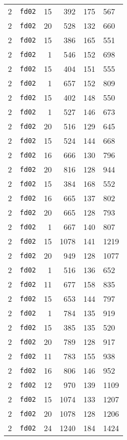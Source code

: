 \documentclass{article}
\begin{document}
\begin{table}[h!]
\begin{tabular}{llrrrl}
    2 & \texttt{fd02} & 15 & 392 & 175 & 567 \\
    2 & \texttt{fd02} & 20 & 528 & 132 & 660 \\
    2 & \texttt{fd02} & 15 & 386 & 165 & 551 \\
    2 & \texttt{fd02} & 1 & 546 & 152 & 698 \\
    2 & \texttt{fd02} & 15 & 404 & 151 & 555 \\
    2 & \texttt{fd02} & 1 & 657 & 152 & 809 \\
    2 & \texttt{fd02} & 15 & 402 & 148 & 550 \\
    2 & \texttt{fd02} & 1 & 527 & 146 & 673 \\
    2 & \texttt{fd02} & 20 & 516 & 129 & 645 \\
    2 & \texttt{fd02} & 15 & 524 & 144 & 668 \\
    2 & \texttt{fd02} & 16 & 666 & 130 & 796 \\
    2 & \texttt{fd02} & 20 & 816 & 128 & 944 \\
    2 & \texttt{fd02} & 15 & 384 & 168 & 552 \\
    2 & \texttt{fd02} & 16 & 665 & 137 & 802 \\
    2 & \texttt{fd02} & 20 & 665 & 128 & 793 \\
    2 & \texttt{fd02} & 1 & 667 & 140 & 807 \\
    2 & \texttt{fd02} & 15 & 1078 & 141 & 1219 \\
    2 & \texttt{fd02} & 20 & 949 & 128 & 1077 \\
    2 & \texttt{fd02} & 1 & 516 & 136 & 652 \\
    2 & \texttt{fd02} & 11 & 677 & 158 & 835 \\
    2 & \texttt{fd02} & 15 & 653 & 144 & 797 \\
    2 & \texttt{fd02} & 1 & 784 & 135 & 919 \\
    2 & \texttt{fd02} & 15 & 385 & 135 & 520 \\
    2 & \texttt{fd02} & 20 & 789 & 128 & 917 \\
    2 & \texttt{fd02} & 11 & 783 & 155 & 938 \\
    2 & \texttt{fd02} & 16 & 806 & 146 & 952 \\
    2 & \texttt{fd02} & 12 & 970 & 139 & 1109 \\
    2 & \texttt{fd02} & 15 & 1074 & 133 & 1207 \\
    2 & \texttt{fd02} & 20 & 1078 & 128 & 1206 \\
    2 & \texttt{fd02} & 24 & 1240 & 184 & 1424 \\

\end{tabular}
\end{table}
\end{document}
